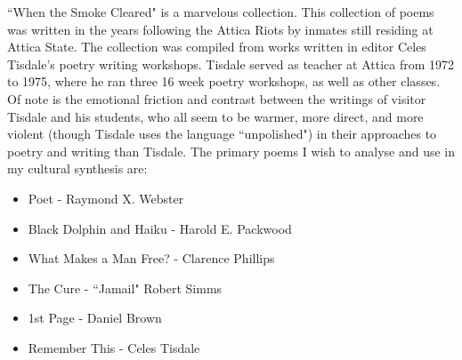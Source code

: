 \documentclass[14pt, letterpaper]{article}
\begin{document}
\begin{adjustwidth}{2.5ex}{0pt}

  ``When the Smoke Cleared" is a marvelous collection. This 
  collection of poems was written in the years following the 
  Attica Riots by inmates still residing at Attica State. The 
  collection was compiled from works written in editor Celes 
  Tisdale's poetry writing workshops. Tisdale served as teacher 
  at Attica from 1972 to 1975, where he ran three 16 week poetry 
  workshops, as well as other classes. Of note is the emotional 
  friction and contrast between the writings of visitor Tisdale 
  and his students, who all seem to be warmer, more direct, and 
  more violent (though Tisdale uses the language 	``unpolished") 
  in their approaches to poetry and writing than Tisdale. The 
  primary poems I wish to analyse and use in my cultural synthesis 
  are: 
  \begin{itemize}
  
    \item Poet - Raymond X. Webster
    
    \item Black Dolphin and Haiku - Harold E. Packwood  
    
    \item What Makes a Man Free? - Clarence Phillips
    
    \item The Cure - ``Jamail" Robert Simms
    
    \item 1st Page - Daniel Brown
    
    \item Remember This - Celes Tisdale
  
  \end{itemize}
  
\end{adjustwidth}



\clearpage

\end{document}

